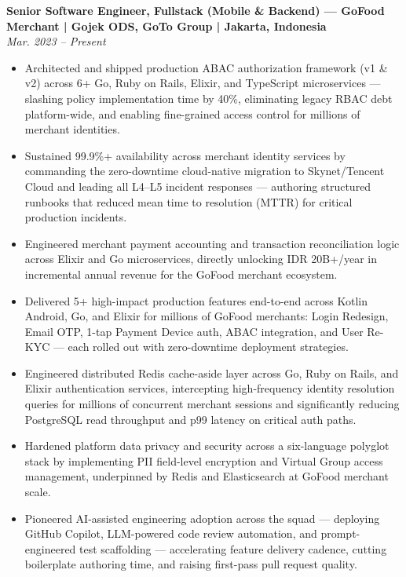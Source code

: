 \documentclass[10pt]{article}
\begin{document}
\textbf{Senior Software Engineer, Fullstack (Mobile \& Backend) --- GoFood Merchant | Gojek ODS, GoTo Group | Jakarta, Indonesia}\\
\textit{Mar. 2023 -- Present}
\begin{itemize}
\item Architected and shipped production ABAC authorization framework (v1 \& v2) across 6+ Go, Ruby on Rails, Elixir, and TypeScript microservices --- slashing policy implementation time by 40\%, eliminating legacy RBAC debt platform-wide, and enabling fine-grained access control for millions of merchant identities.
\item Sustained 99.9\%+ availability across merchant identity services by commanding the zero-downtime cloud-native migration to Skynet/Tencent Cloud and leading all L4--L5 incident responses --- authoring structured runbooks that reduced mean time to resolution (MTTR) for critical production incidents.
\item Engineered merchant payment accounting and transaction reconciliation logic across Elixir and Go microservices, directly unlocking IDR 20B+/year in incremental annual revenue for the GoFood merchant ecosystem.
\item Delivered 5+ high-impact production features end-to-end across Kotlin Android, Go, and Elixir for millions of GoFood merchants: Login Redesign, Email OTP, 1-tap Payment Device auth, ABAC integration, and User Re-KYC --- each rolled out with zero-downtime deployment strategies.
\item Engineered distributed Redis cache-aside layer across Go, Ruby on Rails, and Elixir authentication services, intercepting high-frequency identity resolution queries for millions of concurrent merchant sessions and significantly reducing PostgreSQL read throughput and p99 latency on critical auth paths.
\item Hardened platform data privacy and security across a six-language polyglot stack by implementing PII field-level encryption and Virtual Group access management, underpinned by Redis and Elasticsearch at GoFood merchant scale.
\item Pioneered AI-assisted engineering adoption across the squad --- deploying GitHub Copilot, LLM-powered code review automation, and prompt-engineered test scaffolding --- accelerating feature delivery cadence, cutting boilerplate authoring time, and raising first-pass pull request quality.
\end{itemize}
\end{document}

